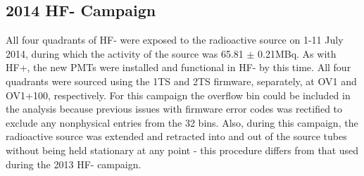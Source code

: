 \subsection{2014 HF- Campaign}
All four quadrants of HF- were exposed to the radioactive source on 1-11 July
2014, during which the activity of the source was 65.81 $\pm$ 0.21\unit{MBq}.
As with HF+, the new PMTs were installed and functional in HF- by this time.
All four quadrants were sourced using the 1TS and 2TS firmware, separately, at
OV1 and OV1+100, respectively. For this campaign the overflow bin could be
included in the analysis because previous issues with firmware error codes was
rectified to exclude any nonphysical entries from the 32 bins. Also, during
this campaign, the radioactive source was extended and retracted into and out
of the source tubes without being held stationary at any point - this
procedure differs from that used during the 2013 HF- campaign.


